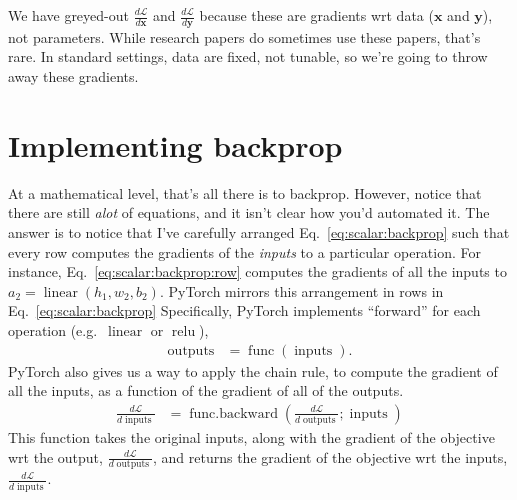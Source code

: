 \documentclass{article}
\newcommand{\dt}[2][]{\frac{d #1}{d #2}}
\newcommand{\dL}{\dt[\L]}
\newcommand{\bracket}[3]{\left#1 #3 \right#2}
\renewcommand{\b}{\bracket{(}{)}}
\newcommand{\x}{\mathbf{x}}
\newcommand{\y}{\mathbf{y}}
\newcommand{\h}{\mathbf{h}}
\renewcommand{\a}{\mathbf{a}}
\renewcommand{\L}{\mathcal{L}}
\newcommand{\linear}{\operatorname{linear}}
\newcommand{\relu}{\operatorname{relu}}
\newcommand{\func}{\operatorname{func}}
\newcommand{\funcback}{\operatorname{func{.}backward}}
\newcommand{\inputs}{\operatorname{inputs}}
\newcommand{\outputs}{\operatorname{outputs}}
\begin{document}
We have greyed-out $\dL{\x}$ and $\dL{\y}$ because these are gradients wrt data ($\x$ and $\y$), not parameters.
While research papers do sometimes use these papers, that's rare.
In standard settings, data are fixed, not tunable, so we're going to throw away these gradients.

\section{Implementing backprop}

At a mathematical level, that's all there is to backprop.
However, notice that there are still \textit{alot} of equations, and it isn't clear how you'd automated it.
The answer is to notice that I've carefully arranged Eq.~\eqref{eq:scalar:backprop} such that every row computes the gradients of the \textit{inputs} to a particular operation.
For instance, Eq.~\eqref{eq:scalar:backprop:row} computes the gradients of all the inputs to $a_2 = \linear(h_1, w_2, b_2)$.
PyTorch mirrors this arrangement in rows in Eq.~\eqref{eq:scalar:backprop}
Specifically, PyTorch implements ``forward'' for each operation (e.g.\ $\linear$ or $\relu$),
\begin{align}
  \outputs &= \func\b{\inputs}.
\end{align}
PyTorch also gives us a way to apply the chain rule, to compute the gradient of all the inputs, as a function of the gradient of all of the outputs.
\begin{align}
\label{eq:general_forward_backward}
  \dL{\inputs} &= \funcback\b{\dL{\outputs}; \inputs}
\end{align}
This function takes the original inputs, along with the gradient of the objective wrt the output, $\dL{\outputs}$, and returns the gradient of the objective wrt the inputs, $\dL{\inputs}$.
\end{document}
